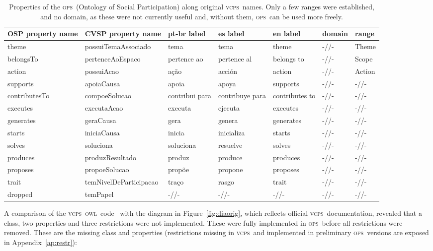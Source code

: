 \documentclass[10pt,letterpaper]{article}
\newcommand{\ops}{\textsc{ops}}
\newcommand{\vcps}{\textsc{vcps}}
\newcommand{\owl}{\textsc{owl}}
\begin{document}
\begin{table}[!h]
  \centering
  \caption{Properties of the \ops\ (Ontology of Social Participation) along original \vcps\ names. Only a few ranges were established, and no domain, as these were not currently useful and, without them, \ops\ can be used more freely.}
  \begin{tabular}{|l|l||p{2.2cm}|p{2.2cm}|p{1.8cm}||l|p{2.2cm}|}\hline
{\bf OSP property name} & {\bf CVSP property name} & {\bf pt-br label} & {\bf es label} & {\bf en label} & {\bf domain} & {\bf range} \\\hline\hline
theme & possuiTemaAssociado & tema & tema & theme & -//- & Theme \\ \hline
belongsTo & pertenceAoEspaco & pertence ao & pertence al & belongs to & -//- & Scope \\ \hline
action & possuiAcao & a\c{c}\~ao & acci\'on & action & -//- & Action \\\hline\hline
supports & apoiaCausa & apoia & apoya & supports & -//- & -//- \\ \hline
contributesTo & compoeSolucao & contribui para & contribuye para & contributes to & -//- & -//- \\ \hline
executes & executaAcao & executa & ejecuta & executes & -//- & -//- \\ \hline
generates & geraCausa & gera & genera & generates & -//- & -//- \\ \hline
starts & iniciaCausa & inicia & inicializa & starts & -//- & -//- \\ \hline
solves & soluciona & soluciona & resuelve & solves & -//- & -//- \\ \hline
produces & produzResultado & produz & produce & produces & -//- & -//- \\\hline
proposes & propoeSolucao & prop\~oe & propone & proposes & -//- & -//- \\\hline
      trait & temNivelDeParticipacao & tra\c{c}o & rasgo & trait & -//- & -//- \\\hline\hline
{\color{red} dropped} & temPapel & -//-  & -//-  & -//-  & -//-  & -//- \\ \hline
  \end{tabular}
  \label{ospProps}
\end{table}

A comparison of the \vcps\ \owl\ code~\cite{owlCCPtg} 
with the diagram in Figure~\ref{fig:diaorig}, which reflects official \vcps\ documentation, revealed that a class, two properties and three restrictions were not implemented. These were fully implemented in \ops\ before all restrictions were removed. These are the missing class and properties (restrictions missing in \vcps\ and implemented in preliminary \ops\ versions are exposed in Appendix~\ref{ap:restr}):
\end{document}
